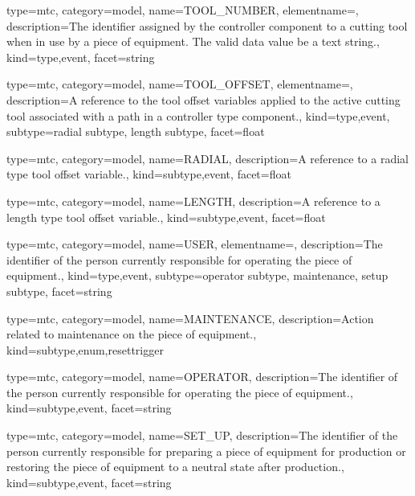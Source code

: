 {
  type=mtc,
  category=model,
  name={TOOL\_NUMBER},
  elementname=,
  description={The identifier assigned by the \gls{controller} component to a cutting tool when in use by a piece of equipment. \newline The \gls{valid data value} \must be a text string.},
  kind={type,event},
  facet={\gls{string}}
}


{
  type=mtc,
  category=model,
  name={TOOL\_OFFSET},
  elementname=,
  description={A reference to the tool offset variables applied to the active cutting tool associated with a \gls{path} in a \gls{controller} type component.},
  kind={type,event},
  subtype={\gls{radial subtype}, \gls{length subtype}},
  facet={\gls{float}}
}



{
  type=mtc,
  category=model,
  name={RADIAL},
  description={A reference to a radial type tool offset variable.},
  kind={subtype,event},
  facet={\gls{float}}
}

{
  type=mtc,
  category=model,
  name={LENGTH},
  description={A reference to a length type tool offset variable.},
  kind={subtype,event},
  facet={\gls{float}}
}


{
  type=mtc,
  category=model,
  name={USER},
  elementname=,
  description={The identifier of the person currently responsible for operating the piece of equipment.},
  kind={type,event},
  subtype={\gls{operator subtype}, \gls{maintenance}, \gls{setup subtype}},
  facet={\gls{string}}
}


{
  type=mtc,
  category=model,
  name={MAINTENANCE},
  description={Action related to maintenance on the piece of equipment.},
  kind={subtype,enum,resettrigger}
}


{
  type=mtc,
  category=model,
  name={OPERATOR},
  description={The identifier of the person currently responsible for operating the piece of equipment.},
  kind={subtype,event},
  facet={\gls{string}}
}


{
  type=mtc,
  category=model,
  name={SET\_UP},
  description={The identifier of the person currently responsible for preparing a piece of equipment for production or restoring the piece of equipment to a neutral state after production.},
  kind={subtype,event},
  facet={\gls{string}}
}


